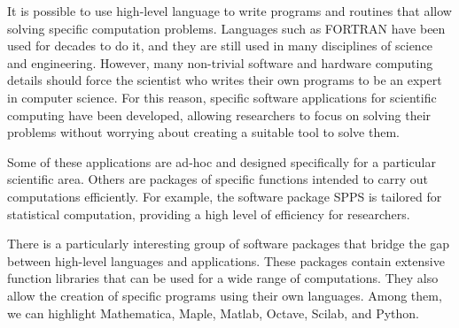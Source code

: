 \begin{paracol}{2}
It is possible to use high-level language to write programs and routines that allow solving specific computation problems. Languages such as FORTRAN have been used for decades to do it, and they are still used in many disciplines of science and engineering. However, many non-trivial software and hardware computing details should force the scientist who writes their own programs to be an expert in computer science. For this reason, specific software applications for scientific computing have been developed, allowing researchers to focus on solving their problems without worrying about creating a suitable tool to solve them.

Some of these applications are ad-hoc and designed specifically for a particular scientific area. Others are packages of specific functions intended to carry out computations efficiently. For example, the software package SPPS is tailored for statistical computation, providing a high level of efficiency for researchers.

There is a particularly interesting group of software packages that bridge the gap between high-level languages and applications. These packages contain extensive function libraries that can be used for a wide range of computations. They also allow the creation of specific programs using their own languages. Among them, we can highlight Mathematica, Maple, Matlab, Octave, Scilab, and Python.   

\end{paracol}